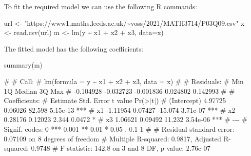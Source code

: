 \documentclass[
  a4paper,
]{article}
\newenvironment{Shaded}{\begin{snugshade}}{\end{snugshade}}
\newcommand{\AttributeTok}[1]{\textcolor[rgb]{0.77,0.63,0.00}{#1}}
\newcommand{\FunctionTok}[1]{\textcolor[rgb]{0.00,0.00,0.00}{#1}}
\newcommand{\NormalTok}[1]{#1}
\newcommand{\OtherTok}[1]{\textcolor[rgb]{0.56,0.35,0.01}{#1}}
\newcommand{\SpecialCharTok}[1]{\textcolor[rgb]{0.00,0.00,0.00}{#1}}
\newcommand{\StringTok}[1]{\textcolor[rgb]{0.31,0.60,0.02}{#1}}
\theoremstyle{definition}
\theoremstyle{definition}
\theoremstyle{definition}
\theoremstyle{definition}
\theoremstyle{remark}
\begin{document}
\begin{myanswers}

To fit the required model we can use the following R commands:

\begin{Shaded}
\begin{Highlighting}[]
\NormalTok{url }\OtherTok{\textless{}{-}} \StringTok{"https://www1.maths.leeds.ac.uk/\textasciitilde{}voss/2021/MATH3714/P03Q09.csv"}
\NormalTok{x }\OtherTok{\textless{}{-}} \FunctionTok{read.csv}\NormalTok{(url)}
\NormalTok{m }\OtherTok{\textless{}{-}} \FunctionTok{lm}\NormalTok{(y }\SpecialCharTok{\textasciitilde{}}\NormalTok{ x1 }\SpecialCharTok{+}\NormalTok{ x2 }\SpecialCharTok{+}\NormalTok{ x3, }\AttributeTok{data=}\NormalTok{x)}
\end{Highlighting}
\end{Shaded}

The fitted model has the following coefficients:

\begin{Shaded}
\begin{Highlighting}[]
\FunctionTok{summary}\NormalTok{(m)}
\end{Highlighting}
\end{Shaded}

\begin{Shaded}
\begin{Highlighting}[]
\NormalTok{\# }
\NormalTok{\# Call:}
\NormalTok{\# lm(formula = y \textasciitilde{} x1 + x2 + x3, data = x)}
\NormalTok{\# }
\NormalTok{\# Residuals:}
\NormalTok{\#       Min        1Q    Median        3Q       Max }
\NormalTok{\# {-}0.104928 {-}0.032723 {-}0.001836  0.024802  0.142993 }
\NormalTok{\# }
\NormalTok{\# Coefficients:}
\NormalTok{\#             Estimate Std. Error t value Pr(\textgreater{}|t|)    }
\NormalTok{\# (Intercept)  4.97725    0.06026  82.598 5.15e{-}13 ***}
\NormalTok{\# x1          {-}1.11954    0.07427 {-}15.074 3.71e{-}07 ***}
\NormalTok{\# x2           0.28176    0.12023   2.344   0.0472 *  }
\NormalTok{\# x3           1.06621    0.09492  11.232 3.54e{-}06 ***}
\NormalTok{\# {-}{-}{-}}
\NormalTok{\# Signif. codes:  0 \textquotesingle{}***\textquotesingle{} 0.001 \textquotesingle{}**\textquotesingle{} 0.01 \textquotesingle{}*\textquotesingle{} 0.05 \textquotesingle{}.\textquotesingle{} 0.1 \textquotesingle{} \textquotesingle{} 1}
\NormalTok{\# }
\NormalTok{\# Residual standard error: 0.07109 on 8 degrees of freedom}
\NormalTok{\# Multiple R{-}squared:  0.9817,  Adjusted R{-}squared:  0.9748 }
\NormalTok{\# F{-}statistic: 142.8 on 3 and 8 DF,  p{-}value: 2.76e{-}07}
\end{Highlighting}
\end{Shaded}

\end{myanswers}
\end{document}
